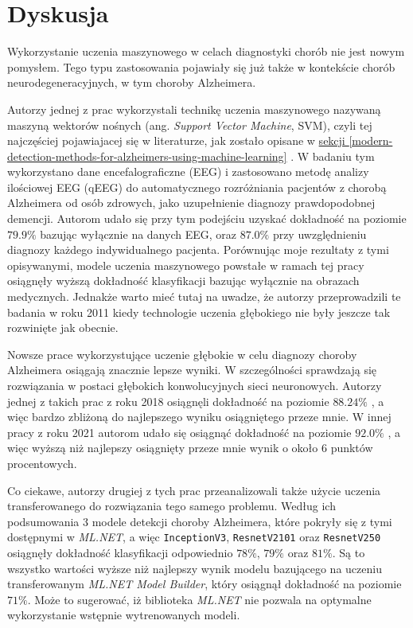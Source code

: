 \chapter{Dyskusja}

Wykorzystanie uczenia maszynowego w celach diagnostyki chorób nie jest nowym pomysłem.
Tego typu zastosowania pojawiały się już także w kontekście chorób neurodegeneracyjnych, w tym choroby Alzheimera.

Autorzy jednej z prac wykorzystali technikę uczenia maszynowego nazywaną maszyną wektorów nośnych (ang. \emph{Support Vector Machine}, SVM), czyli tej najczęściej pojawiajacej się w literaturze, jak zostało opisane w \hyperref[modern-detection-methods-for-alzheimers-using-machine-learning]{sekcji \ref*{modern-detection-methods-for-alzheimers-using-machine-learning}} \cite{trambaiolli2011improving}.
W badaniu tym wykorzystano dane encefalograficzne (EEG) i zastosowano metodę analizy ilościowej EEG (qEEG) do automatycznego rozróżniania pacjentów z chorobą Alzheimera od osób zdrowych, jako uzupełnienie diagnozy prawdopodobnej demencji.
Autorom udało się przy tym podejściu uzyskać dokładność na poziomie $79.9\%$ bazując wyłącznie na danych EEG, oraz $87.0\%$ przy uwzględnieniu diagnozy każdego indywidualnego pacjenta.
Porównując moje rezultaty z tymi opisywanymi, modele uczenia maszynowego powstałe w ramach tej pracy osiągnęły wyższą dokładność klasyfikacji bazując wyłącznie na obrazach medycznych.
Jednakże warto mieć tutaj na uwadze, że autorzy przeprowadzili te badania w roku 2011 kiedy technologie uczenia głębokiego nie były jeszcze tak rozwinięte jak obecnie.

Nowsze prace wykorzystujące uczenie głębokie w celu diagnozy choroby Alzheimera osiągają znacznie lepsze wyniki.
W szczególności sprawdzają się rozwiązania w postaci głębokich konwolucyjnych sieci neuronowych.
Autorzy jednej z takich prac z roku 2018 osiągnęli dokładność na poziomie $88.24\%$ \cite{shahbaz2019classification}, a więc bardzo zbliżoną do najlepszego wyniku osiągniętego przeze mnie.
W innej pracy z roku 2021 autorom udało się osiągnąć dokładność na poziomie $92.0\%$ \cite{ebrahimi2021deep}, a więc wyższą niż najlepszy osiągnięty przeze mnie wynik o około 6 punktów procentowych.

Co ciekawe, autorzy drugiej z tych prac przeanalizowali także użycie uczenia transferowanego do rozwiązania tego samego problemu.
Według ich podsumowania 3 modele detekcji choroby Alzheimera, które pokryły się z tymi dostępnymi w \emph{ML.NET}, a więc \lstinline{InceptionV3}, \lstinline{ResnetV2101} oraz \lstinline{ResnetV250} osiągnęły dokładność klasyfikacji odpowiednio $78\%$, $79\%$ oraz $81\%$.
Są to wszystko wartości wyższe niż najlepszy wynik modelu bazującego na uczeniu transferowanym \emph{ML.NET Model Builder}, który osiągnął dokładność na poziomie $71\%$.
Może to sugerować, iż biblioteka \emph{ML.NET} nie pozwala na optymalne wykorzystanie wstępnie wytrenowanych modeli.

